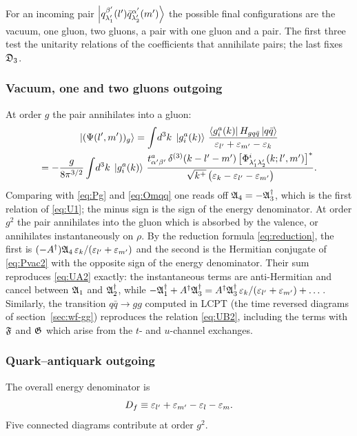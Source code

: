 For an incoming pair $\left|q^{\beta'}_{\lambda_{1}'}(l')\bar q^{\alpha'}_{\lambda_{2}'}(m')\right\rangle$ the possible
final configurations are the vacuum, one gluon, two gluons, a pair with one gluon and a pair. The
first three test the unitarity relations of the coefficients that annihilate pairs; the last
fixes $\mathfrak{D}_{3}$.

\subsubsection{Vacuum, one and two gluons outgoing}

At order $g$ the pair annihilates into a gluon:
\begin{multline}
\left|(\Psi(l',m'))_{g}\right\rangle=\int\!d^{3}k\;\left|g^{a}_{i}(k)\right\rangle\,
\frac{\left\langle g^{a}_{i}(k)\right|H_{gq\bar q}\left|q\bar q\right\rangle}{\varepsilon_{l'}+\varepsilon_{m'}-\varepsilon_{k}}\\
=-\frac{g}{8\pi^{3/2}}\int\!d^{3}k\;\left|g^{a}_{i}(k)\right\rangle\,
\frac{t^{a}_{\alpha'\beta'}\,\delta^{(3)}(k-l'-m')\,\big[\Phi^{i}_{\lambda_{1}'\lambda_{2}'}(k;l',m')\big]^{*}}
{\sqrt{k^{+}}\,\big(\varepsilon_{k}-\varepsilon_{l'}-\varepsilon_{m'}\big)} .
\label{eq:Pqq-g}
\end{multline}
Comparing with \eqref{eq:Pg} and \eqref{eq:Omqq} one reads off
$\mathfrak{A}_{4}=-\mathfrak{A}_{3}^{\dagger}$, which is the first relation of \eqref{eq:U1}; the minus sign is the
sign of the energy denominator. At order $g^{2}$ the pair annihilates into the gluon which is
absorbed by the valence, or annihilates instantaneously on $\rho$. By the reduction formula
\eqref{eq:reduction}, the first is $(-A^{\dagger})\mathfrak{A}_{4}\,\varepsilon_{k}/(\varepsilon_{l'}+\varepsilon_{m'})$ and the second
is the Hermitian conjugate of \eqref{eq:Pvac2} with the opposite sign of the energy
denominator. Their sum reproduces \eqref{eq:UA2} exactly: the instantaneous terms are
anti-Hermitian and cancel between $\mathfrak{A}_{1}$ and $\mathfrak{A}_{2}^{\dagger}$, while
$-\mathfrak{A}_{1}^{\dagger}+A^{\dagger}\mathfrak{A}_{3}^{\dagger}=A^{\dagger}\mathfrak{A}_{3}^{\dagger}\,\varepsilon_{k}/(\varepsilon_{l'}+\varepsilon_{m'})+\dots$.
Similarly, the transition $q\bar q\to gg$ computed in LCPT (the time reversed diagrams of
section~\ref{sec:wf-gg}) reproduces the relation \eqref{eq:UB2}, including the terms with $\mathfrak{F}$
and $\mathfrak{G}$ which arise from the $t$- and $u$-channel exchanges.

\subsubsection{Quark--antiquark outgoing}

The overall energy denominator is
\begin{equation}
D_{f}\equiv\varepsilon_{l'}+\varepsilon_{m'}-\varepsilon_{l}-\varepsilon_{m}.
\end{equation}
Five connected diagrams contribute at order $g^{2}$.

